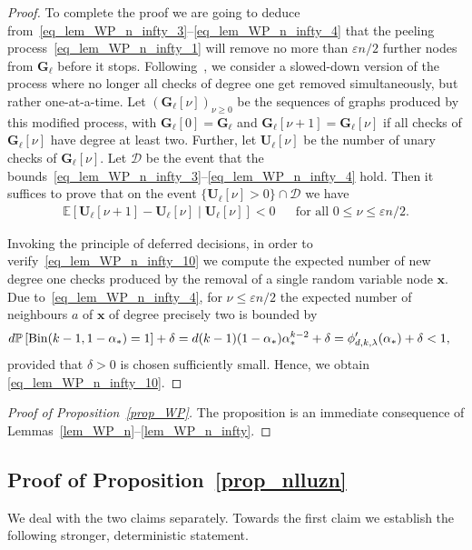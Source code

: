 \documentclass[10pt,reqno]{amsart}
\numberwithin{equation}{section}
\renewcommand{\vec}[1]{\boldsymbol{#1}}
\newcommand\cD{\mathcal D}
\newcommand\vG{\vec G}
\newcommand\vU{\vec U}
\newcommand\vx{\vec x}
\newcommand\eps{\varepsilon}
\newcommand\Erw{\mathbb{E}}
\newcommand\ex{\Erw}
\newcommand{\Bin}{{\rm Bin}}
\newcommand\brk[1]{\left\lbrack{#1}\right\rbrack}
\newcommand\pr{\mathbb{P}}
\newcommand\Lem{Lemma}
\newcommand\Prop{Proposition}
\def\pr{{\mathbb P}}
\newcommand{\ph}{\phi_{d,k,\lambda}}
\begin{document}
\begin{proof}
	To complete the proof we are going to deduce from~\eqref{eq_lem_WP_n_infty_3}--\eqref{eq_lem_WP_n_infty_4} that the peeling process~\eqref{eq_lem_WP_n_infty_1} will remove no more than $\eps n/2$ further nodes from $\vG_\ell$ before it stops.
	Following~\cite{Molloy}, we consider a slowed-down version of the process where no longer all checks of degree one get removed simultaneously, but rather one-at-a-time.
	Let $(\vG_\ell[\nu])_{\nu\geq0}$ be the sequences of graphs produced by this modified process, with $\vG_\ell[0]=\vG_\ell$ and $\vG_\ell[\nu+1]=\vG_\ell[\nu]$ if all checks of $\vG_\ell[\nu]$ have degree at least two.
	Further, let $\vU_\ell[\nu]$ be the number of unary checks of $\vG_\ell[\nu]$.
	Let $\cD$ be the event that the bounds~\eqref{eq_lem_WP_n_infty_3}--\eqref{eq_lem_WP_n_infty_4} hold.
	Then it suffices to prove that on the event $\{\vU_\ell[\nu]>0\}\cap\cD$ we have
	\begin{align}\label{eq_lem_WP_n_infty_10}
		\ex\brk{\vU_\ell[\nu+1]-\vU_\ell[\nu]\mid\vU_\ell[\nu]}<0&&\mbox{for all }0\leq \nu\leq\eps n/2.
	\end{align}

	Invoking the principle of deferred decisions, in order to verify~\eqref{eq_lem_WP_n_infty_10} we compute the expected number of new degree one checks produced by the removal of a single random variable node $\vx$.
	Due to~\eqref{eq_lem_WP_n_infty_4}, for $\nu\leq\eps n/2$ the expected number of neighbours $a$ of $\vx$ of degree precisely two is bounded by
	\begin{align*}
		d\pr\brk{\Bin(k-1,1-\alpha_*)=1}+\delta&=d(k-1)(1-\alpha_*)\alpha_*^{k-2}+\delta=\ph'(\alpha_*)+\delta<1,
	\end{align*}
	provided that $\delta>0$ is chosen sufficiently small.
	Hence, we obtain \eqref{eq_lem_WP_n_infty_10}.
\end{proof}



\begin{proof}[Proof of \Prop~\ref{prop_WP}]
	The proposition is an immediate consequence of \Lem s~\ref{lem_WP_n}--\ref{lem_WP_n_infty}.
\end{proof}


\subsection{Proof of \Prop~\ref{prop_nlluzn}}\label{sec_prop_nlluzn}
We deal with the two claims separately.
Towards the first claim we establish the following stronger, deterministic statement.
\end{document}

